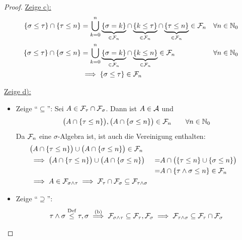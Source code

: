 \begin{proof}
	\underline{Zeige c):}%
	\begin{align*}
		\lbrace\sigma\leq\tau\rbrace\cap\lbrace\tau\leq n\rbrace
		&=\bigcup\limits_{k=0}^n\underbrace{\lbrace \sigma=k\rbrace}_{\in\mathcal{F}_n}\cap\underbrace{\lbrace k\leq\tau\rbrace}_{\in\mathcal{F}_n}\cap\underbrace{\lbrace\tau\leq n\rbrace}_{\in\mathcal{F}_n}\in\mathcal{F}_n &\forall n\in\mathbb{N}_0\\
		\lbrace\sigma\leq\tau\rbrace\cap\lbrace\sigma\leq n\rbrace
		&=\bigcup\limits_{k=0}^n\underbrace{\lbrace\sigma=k\rbrace}_{\in \mathcal{F}_n}\cap\underbrace{\lbrace k\leq n\rbrace}_{\in\mathcal{F}_n}\in\mathcal{F}_n &\forall n\in\mathbb{N}_0\\
		&\implies\lbrace\sigma\leq\tau\rbrace\in\mathcal{F}_n
	\end{align*}

	\underline{Zeige d):}\
	\begin{itemize}
		\item Zeige ``$\subseteq$'':
		Sei $A\in\mathcal{F}_\tau\cap\mathcal{F}_\sigma$. Dann ist $A\in\mathcal{A}$ und
		\begin{align*}
			\big(A\cap\lbrace\tau\leq n\rbrace\big),\big(A\cap\lbrace\sigma\leq n\rbrace\big)\in\mathcal{F}_n\qquad\forall n\in\mathbb{N}_0
		\end{align*}
		Da $\mathcal{F}_n$ eine $\sigma$-Algebra ist, ist auch die Vereinigung enthalten:
		\begin{align*}
			&\big(A\cap\lbrace\tau\leq n\rbrace\big)\cup\big(A\cap\lbrace\sigma\leq n\rbrace\big)\in\mathcal{F}_n\\
			&\implies
			\big(A\cap\lbrace\tau\leq n\rbrace\big)\cup\big(A\cap\lbrace\sigma\leq n\rbrace\big)
			&=&A\cap\big(\lbrace\tau\leq n\rbrace\cup\lbrace\sigma\leq n\rbrace\big)\\
			&&=&A\cap\lbrace\tau\wedge\sigma\leq n\rbrace\in\mathcal{F}_n\\
			&\implies A\in\mathcal{F}_{\sigma\wedge\tau}\implies \mathcal{F}_\tau\cap\mathcal{F}_\sigma\subseteq\mathcal{F}_{\tau\wedge\sigma}
		\end{align*}

		\item Zeige ``$\supseteq$'':
		\begin{align*}
			\tau\wedge\sigma\stackrel{\text{Def}}{\leq}\tau,\sigma\stackrel{\text{(b)}}{\implies}\mathcal{F}_{\sigma\wedge\tau}\subseteq\mathcal{F}_\tau,\mathcal{F}_\sigma\implies\mathcal{F}_{\tau\wedge\sigma}\subseteq\mathcal{F}_\tau\cap\mathcal{F}_\sigma
		\end{align*}
	\end{itemize}
\end{proof}

